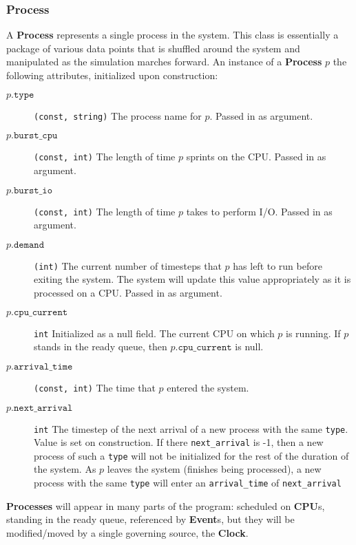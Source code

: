 \documentclass{article}
\begin{document}
\subsubsection*{Process}
A \textbf{Process} represents a single process in the system. This class is essentially a package of various data points that is shuffled
around the system and manipulated as the simulation marches forward. An instance of a \textbf{Process} $p$ the following attributes, initialized
upon construction:
\begin{description}
    \item[$p.\texttt{type}$]{\texttt{(const, string)} The process name for $p$. Passed in as argument.}
    \item[$p.\texttt{burst\_cpu}$]{\texttt{(const, int)} The length of time $p$ sprints on the CPU\@. Passed in as argument.}
    \item[$p.\texttt{burst\_io}$]{\texttt{(const, int)} The length of time $p$ takes to perform I/O\@. Passed in as argument.}
    \item[$p.\texttt{demand}$]{\texttt{(int)} The current number of timesteps that $p$ has left to run before exiting the system. 
                               The system will update this value appropriately as it is processed on a CPU\@. Passed in as argument.}

    \item[$p.\texttt{cpu\_current}$]{\texttt{int} Initialized as a null field. 
                                     The current CPU on which $p$ is running. 
                                     If $p$ stands in the ready queue, then $p.\texttt{cpu\_current}$ is null.}

    \item[$p.\texttt{arrival\_time}$]{\texttt{(const, int)} The time that $p$ entered the system.}

    \item[$p.\texttt{next\_arrival}$]{\texttt{int} The timestep of the next arrival of a new process with the same \texttt{type}. Value is 
        set on construction. If there \texttt{next\_arrival} is -1, then a new process of such a \texttt{type} will not be initialized for the
        rest of the duration of the system. As $p$ leaves the system (finishes being processed), a new process with the same \texttt{type} will
        enter an \texttt{arrival\_time} of \texttt{next\_arrival}}
\end{description}
\textbf{Processes} will appear in many parts of the program: scheduled on \textbf{CPU}s, standing in the ready queue, referenced by \textbf{Event}s, but
they will be modified/moved by a single governing source, the \textbf{Clock}.
\end{document}
